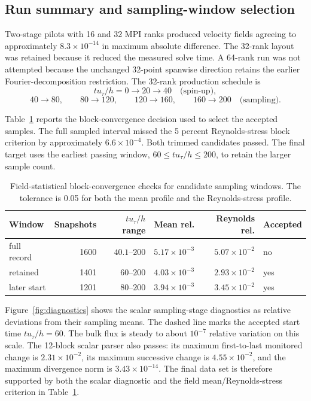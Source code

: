 \documentclass[11pt]{article}
\begin{document}
\subsection{Run summary and sampling-window selection}

Two-stage pilots with 16 and 32 MPI ranks produced velocity fields agreeing to
approximately \(8.3\times10^{-14}\) in maximum absolute difference. The
32-rank layout was retained because it reduced the measured solve time. A
64-rank run was not attempted because the unchanged 32-point spanwise
direction retains the earlier Fourier-decomposition restriction. The
32-rank production schedule is
\[
  t u_{\tau}/h=0\to20\to40\quad\text{(spin-up)},
\]
\[
  40\to80,\qquad 80\to120,\qquad
  120\to160,\qquad 160\to200\quad\text{(sampling)}.
\]

Table~\ref{tab:window_convergence} reports the block-convergence decision used
to select the accepted samples. The full sampled interval missed the
5 percent Reynolds-stress block criterion by approximately \(6.6\times10^{-4}\).
Both trimmed candidates passed. The final target uses the earliest passing
window, \(60\le t u_{\tau}/h\le200\), to retain the larger sample count.

\begin{table}[t]
  \centering
  \caption{Field-statistical block-convergence checks for candidate sampling
  windows. The tolerance is 0.05 for both the mean profile and the
  Reynolds-stress profile.}
  \label{tab:window_convergence}
  \begin{tabular}{lrrrrl}
    \toprule
    Window & Snapshots & \(t u_{\tau}/h\) range & Mean rel. & Reynolds rel. & Accepted \\
    \midrule
    full record & 1600 & \(40.1\)--\(200\) & \(5.17\times10^{-3}\) & \(5.07\times10^{-2}\) & no \\
    retained & 1401 & \(60\)--\(200\) & \(4.03\times10^{-3}\) & \(2.93\times10^{-2}\) & yes \\
    later start & 1201 & \(80\)--\(200\) & \(3.94\times10^{-3}\) & \(3.45\times10^{-2}\) & yes \\
    \bottomrule
  \end{tabular}
\end{table}

Figure~\ref{fig:diagnostics} shows the scalar sampling-stage diagnostics as
relative deviations from their sampling means. The dashed line marks the
accepted start time \(t u_{\tau}/h=60\). The bulk flux is steady to about \(10^{-7}\)
relative variation on this scale. The 12-block scalar parser also passes: its
maximum first-to-last monitored change is \(2.31\times10^{-2}\), its maximum
successive change is \(4.55\times10^{-2}\), and the maximum divergence norm is
\(3.43\times10^{-14}\). The final data set is therefore supported by both the
scalar diagnostic and the field mean/Reynolds-stress criterion in
Table~\ref{tab:window_convergence}.
\end{document}

